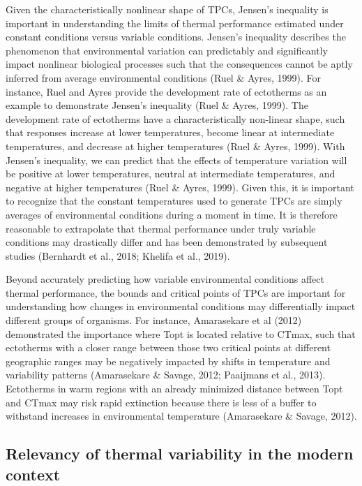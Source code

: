 \documentclass[12pt,twoside]{reedthesis}
\begin{document}
Given the characteristically nonlinear shape of TPCs, Jensen's inequality is important in understanding the limits of thermal performance estimated under constant conditions versus variable conditions. Jensen's inequality describes the phenomenon that environmental variation can predictably and significantly impact nonlinear biological processes such that the consequences cannot be aptly inferred from average environmental conditions (Ruel \& Ayres, 1999). For instance, Ruel and Ayres provide the development rate of ectotherms as an example to demonstrate Jensen's inequality (Ruel \& Ayres, 1999). The development rate of ectotherms have a characteristically non-linear shape, such that responses increase at lower temperatures, become linear at intermediate temperatures, and decrease at higher temperatures (Ruel \& Ayres, 1999). With Jensen's inequality, we can predict that the effects of temperature variation will be positive at lower temperatures, neutral at intermediate temperatures, and negative at higher temperatures (Ruel \& Ayres, 1999). Given this, it is important to recognize that the constant temperatures used to generate TPCs are simply averages of environmental conditions during a moment in time. It is therefore reasonable to extrapolate that thermal performance under truly variable conditions may drastically differ and has been demonstrated by subsequent studies (Bernhardt et al., 2018; Khelifa et al., 2019).

Beyond accurately predicting how variable environmental conditions affect thermal performance, the bounds and critical points of TPCs are important for understanding how changes in environmental conditions may differentially impact different groups of organisms. For instance, Amarasekare et al (2012) demonstrated the importance where Topt is located relative to CTmax, such that ectotherms with a closer range between those two critical points at different geographic ranges may be negatively impacted by shifts in temperature and variability patterns (Amarasekare \& Savage, 2012; Paaijmans et al., 2013). Ectotherms in warm regions with an already minimized distance between Topt and CTmax may risk rapid extinction because there is less of a buffer to withstand increases in environmental temperature (Amarasekare \& Savage, 2012).

\hypertarget{relevancy-of-thermal-variability-in-the-modern-context}{%
\subsection{Relevancy of thermal variability in the modern context}\label{relevancy-of-thermal-variability-in-the-modern-context}}
\end{document}
